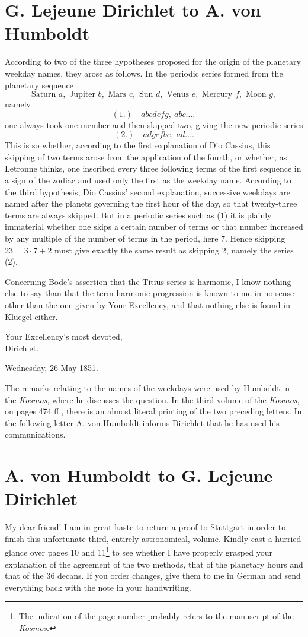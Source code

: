 \documentclass[11pt]{article}
\newcommand{\sign}[1]{\begin{flushright}#1\end{flushright}}
\begin{document}
\section*{G. Lejeune Dirichlet to A. von Humboldt}
According to two of the three hypotheses proposed for the origin of the planetary weekday names, they arose as follows. In the periodic series formed from the planetary sequence
\[
\text{Saturn }a,
\text{ Jupiter }b,
\text{ Mars }c,
\text{ Sun }d,
\text{ Venus }e,
\text{ Mercury }f,
\text{ Moon }g,
\]
namely
\[
(1.)\quad abcdefg,\ abc\ldots,
\]
one always took one member and then skipped two, giving the new periodic series
\[
(2.)\quad adgcfbe,\ ad\ldots.
\]
This is so whether, according to the first explanation of Dio Cassius, this skipping of two terms arose from the application of the fourth, or whether, as Letronne thinks, one inscribed every three following terms of the first sequence in a sign of the zodiac and used only the first as the weekday name. According to the third hypothesis, Dio Cassius' second explanation, successive weekdays are named after the planets governing the first hour of the day, so that twenty-three terms are always skipped. But in a periodic series such as (1) it is plainly immaterial whether one skips a certain number of terms or that number increased by any multiple of the number of terms in the period, here 7. Hence skipping \(23=3\cdot7+2\) must give exactly the same result as skipping 2, namely the series (2).

Concerning Bode's assertion that the Titius series is harmonic, I know nothing else to say than that the term harmonic progression is known to me in no sense other than the one given by Your Excellency, and that nothing else is found in Kluegel either. \sign{Your Excellency's most devoted,\\ Dirichlet.}
Wednesday, 26 May 1851.

The remarks relating to the names of the weekdays were used by Humboldt in the \emph{Kosmos}, where he discusses the question. In the third volume of the \emph{Kosmos}, on pages 474 ff., there is an almost literal printing of the two preceding letters. In the following letter A. von Humboldt informs Dirichlet that he has used his communications.

\section*{A. von Humboldt to G. Lejeune Dirichlet}
My dear friend! I am in great haste to return a proof to Stuttgart in order to finish this unfortunate third, entirely astronomical, volume. Kindly cast a hurried glance over pages 10 and 11\footnote{The indication of the page number probably refers to the manuscript of the \emph{Kosmos}.} to see whether I have properly grasped your explanation of the agreement of the two methods, that of the planetary hours and that of the 36 decans. If you order changes, give them to me in German and send everything back with the note in your handwriting.
\end{document}
